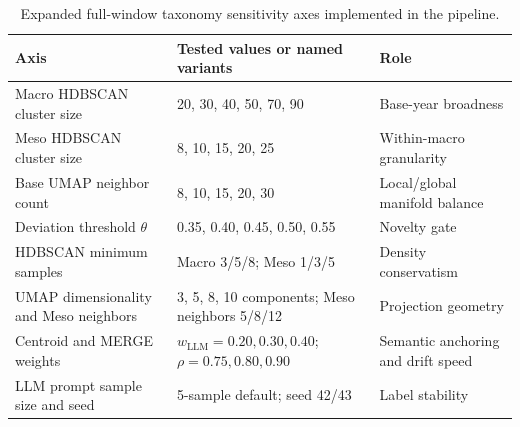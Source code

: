 \documentclass[11pt, a4paper]{article}
\begin{document}
\begin{table}[H]
\centering
\caption{Expanded full-window taxonomy sensitivity axes implemented in the pipeline.}
\label{tab:taxonomy_sensitivity_axes}
\vspace{0.2cm}
\renewcommand{\arraystretch}{1.16}
\small
\begin{tabularx}{\textwidth}{@{}L{4.2cm}L{7.9cm}L{2.4cm}@{}}
\toprule
\textbf{Axis} & \textbf{Tested values or named variants} & \textbf{Role} \\
\midrule
Macro HDBSCAN cluster size & 20, 30, 40, 50, 70, 90 & Base-year broadness \\
Meso HDBSCAN cluster size & 8, 10, 15, 20, 25 & Within-macro granularity \\
Base UMAP neighbor count & 8, 10, 15, 20, 30 & Local/global manifold balance \\
Deviation threshold $\theta$ & 0.35, 0.40, 0.45, 0.50, 0.55 & Novelty gate \\
HDBSCAN minimum samples & Macro 3/5/8; Meso 1/3/5 & Density conservatism \\
UMAP dimensionality and Meso neighbors & 3, 5, 8, 10 components; Meso neighbors 5/8/12 & Projection geometry \\
Centroid and MERGE weights & $w_{\text{LLM}}=0.20,0.30,0.40$; $\rho=0.75,0.80,0.90$ & Semantic anchoring and drift speed \\
LLM prompt sample size and seed & 5-sample default; seed 42/43 & Label stability \\
\bottomrule
\end{tabularx}
\end{table}
\end{document}
